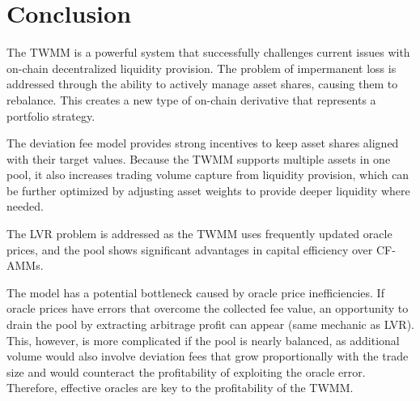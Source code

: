 \section*{Conclusion}
The TWMM is a powerful system that successfully challenges current issues with on-chain decentralized liquidity provision. The problem of impermanent loss is addressed through the ability to actively manage asset shares, causing them to rebalance. This creates a new type of on-chain derivative that represents a portfolio strategy. 

The deviation fee model provides strong incentives to keep asset shares aligned with their target values. Because the TWMM supports multiple assets in one pool, it also increases trading volume capture from liquidity provision, which can be further optimized by adjusting asset weights to provide deeper liquidity where needed. 

The LVR problem is addressed as the TWMM uses frequently updated oracle prices, and the pool shows significant advantages in capital efficiency over CF-AMMs.

The model has a potential bottleneck caused by oracle price inefficiencies. If oracle prices have errors that overcome the collected fee value, an opportunity to drain the pool by extracting arbitrage profit can appear (same mechanic as LVR). This, however, is more complicated if the pool is nearly balanced, as additional volume would also involve deviation fees that grow proportionally with the trade size and would counteract the profitability of exploiting the oracle error. Therefore, effective oracles are key to the profitability of the TWMM.